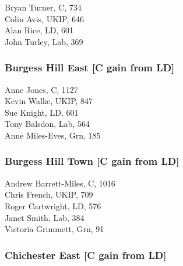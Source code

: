 \documentclass[a4paper,openany,10pt]{book}
\begin{document}


Bryan Turner, C, 734\\
Colin Avis, UKIP, 646\\
Alan Rice, LD, 601\\
John Turley, Lab, 369\\


\subsubsection*{Burgess Hill East \hspace*{\fill}\nolinebreak[1]%
\enspace\hspace*{\fill}
[C gain from LD]}



Anne Jones, C, 1127\\
Kevin Walke, UKIP, 847\\
Sue Knight, LD, 601\\
Tony Balsdon, Lab, 564\\
Anne Miles-Eves, Grn, 185\\


\subsubsection*{Burgess Hill Town \hspace*{\fill}\nolinebreak[1]%
\enspace\hspace*{\fill}
[C gain from LD]}



Andrew Barrett-Miles, C, 1016\\
Chris French, UKIP, 709\\
Roger Cartwright, LD, 576\\
Janet Smith, Lab, 384\\
Victoria Grimmett, Grn, 91\\


\subsubsection*{Chichester East \hspace*{\fill}\nolinebreak[1]%
\enspace\hspace*{\fill}
[C gain from LD]}
\end{document}
